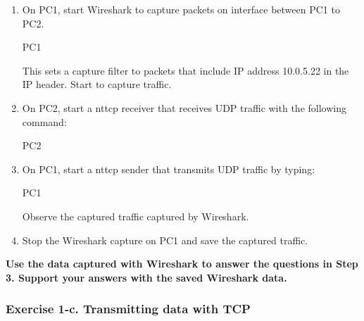 \begin{enumerate}
	\item On PC1, start Wireshark to capture packets on interface  between PC1 to PC2. 
		\begin{cmdblock}
	PC1%
		\end{cmdblock}
		This sets a capture filter to packets that include IP address 10.0.5.22 in the IP header. Start to capture traffic.
	\item On PC2, start a nttcp receiver that receives UDP traffic with the following command: 
		\begin{cmdblock}
			PC2%
		\end{cmdblock}
	\item On PC1, start a nttcp sender that transmits UDP traffic by typing: 
		\begin{cmdblock}
			PC1%
		\end{cmdblock}
		Observe the captured traffic captured by Wireshark. 
	\item Stop the Wireshark capture on PC1 and save the captured traffic.
\end{enumerate}

\textbf{Use the data captured with Wireshark to answer the questions in Step 3. Support your answers with the saved Wireshark data.}
\begin{questions}
\end{questions}

\subsubsection{Exercise 1-c. Transmitting data with TCP}


